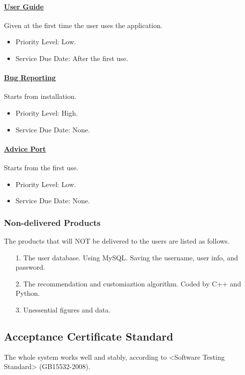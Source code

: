 \documentclass[10pt]{article}
\begin{document}
\paragraph{\underline{User Guide}} Given at the first time the user uses the application.

\begin{itemize}
	\item Priority Level: Low.
	\item Service Due Date: After the first use.
\end{itemize}

\paragraph{\underline{Bug Reporting}} Starts from installation.

\begin{itemize}
	\item Priority Level: High.
	\item Service Due Date: None.
\end{itemize}

\paragraph{\underline{Advice Port}} Starts from the first use.

\begin{itemize}
	\item Priority Level: Low.
	\item Service Due Date: None.
\end{itemize}

\subsubsection{Non-delivered Products}
The products that will NOT be delivered to the users are listed as follows.

\begin{itemize}
	\item[1.] The user database. Using MySQL. Saving the username, user info, and password.
	\item[2.] The recommendation and customiaztion algorithm. Coded by C++ and Python. 

	\item[3.] Unessential figures and data.
\end{itemize}

\subsection{Acceptance Certificate Standard}
The whole system works well and stably, according to <Software Testing Standard> (GB15532-2008).
\end{document}
